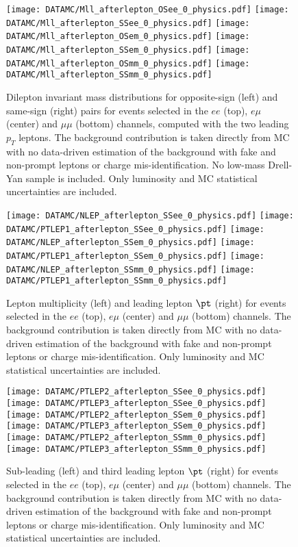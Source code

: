 \begin{figure}[htb!]
\centering
{\texttt{[image: DATAMC/Mll\_afterlepton\_OSee\_0\_physics.pdf]}}
{\texttt{[image: DATAMC/Mll\_afterlepton\_SSee\_0\_physics.pdf]}}
{\texttt{[image: DATAMC/Mll\_afterlepton\_OSem\_0\_physics.pdf]}}
{\texttt{[image: DATAMC/Mll\_afterlepton\_SSem\_0\_physics.pdf]}}
{\texttt{[image: DATAMC/Mll\_afterlepton\_OSmm\_0\_physics.pdf]}}
{\texttt{[image: DATAMC/Mll\_afterlepton\_SSmm\_0\_physics.pdf]}}
\caption{Dilepton invariant mass distributions for opposite-sign (left) and same-sign (right) pairs for events selected in the $ee$ (top), $e\mu$ (center) and $\mu\mu$ (bottom) channels, computed with the two leading $p_T$ leptons. The background contribution is taken directly from MC with no data-driven estimation of the background with fake and non-prompt leptons or charge mis-identification. No low-mass Drell-Yan sample is included. Only luminosity and MC statistical uncertainties are included.
}
\label{fig:dataMC_2lep}
\end{figure}

\begin{figure}[htb!]
\centering
{\texttt{[image: DATAMC/NLEP\_afterlepton\_SSee\_0\_physics.pdf]}}
{\texttt{[image: DATAMC/PTLEP1\_afterlepton\_SSee\_0\_physics.pdf]}}
{\texttt{[image: DATAMC/NLEP\_afterlepton\_SSem\_0\_physics.pdf]}}
{\texttt{[image: DATAMC/PTLEP1\_afterlepton\_SSem\_0\_physics.pdf]}}
{\texttt{[image: DATAMC/NLEP\_afterlepton\_SSmm\_0\_physics.pdf]}}
{\texttt{[image: DATAMC/PTLEP1\_afterlepton\_SSmm\_0\_physics.pdf]}}
\caption{Lepton multiplicity (left) and leading lepton $\pt$ (right) for events selected in the $ee$ (top), $e\mu$ (center) and $\mu\mu$ (bottom) channels. The background contribution is taken directly from MC with no data-driven estimation of the background with fake and non-prompt leptons or charge mis-identification. Only luminosity and MC statistical uncertainties are included.
}
\label{fig:dataMC_lep1}
\end{figure}

\begin{figure}[htb!]
\centering
{\texttt{[image: DATAMC/PTLEP2\_afterlepton\_SSee\_0\_physics.pdf]}}
{\texttt{[image: DATAMC/PTLEP3\_afterlepton\_SSee\_0\_physics.pdf]}}
{\texttt{[image: DATAMC/PTLEP2\_afterlepton\_SSem\_0\_physics.pdf]}}
{\texttt{[image: DATAMC/PTLEP3\_afterlepton\_SSem\_0\_physics.pdf]}}
{\texttt{[image: DATAMC/PTLEP2\_afterlepton\_SSmm\_0\_physics.pdf]}}
{\texttt{[image: DATAMC/PTLEP3\_afterlepton\_SSmm\_0\_physics.pdf]}}
\caption{Sub-leading (left) and third leading lepton $\pt$ (right) for events selected in the $ee$ (top), $e\mu$ (center) and $\mu\mu$ (bottom) channels. The background contribution is taken directly from MC with no data-driven estimation of the background with fake and non-prompt leptons or charge mis-identification. Only luminosity and MC statistical uncertainties are included.
}
\label{fig:dataMC_lep2}
\end{figure}


